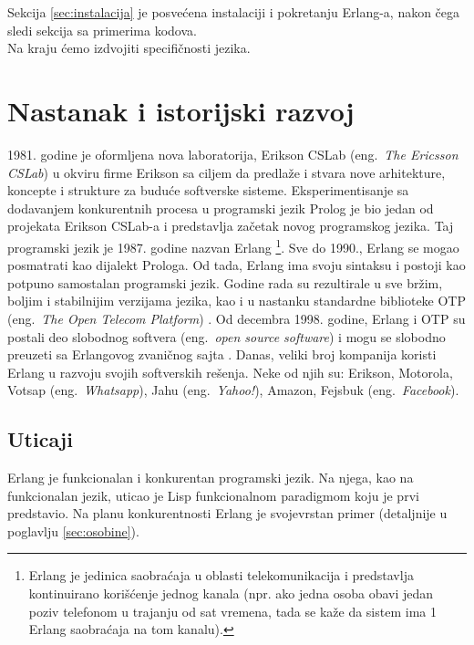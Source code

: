 \documentclass[a4paper]{article}
\begin{document}
{Sekcija \ref{sec:instalacija} je posve\' cena instalaciji i pokretanju Erlang-a, nakon \v cega sledi sekcija sa primerima kodova.\\

Na kraju \' cemo izdvojiti specifičnosti jezika.

\section{Nastanak i istorijski razvoj}
\label{sec:nastanak}

1981. godine je oformljena nova laboratorija, Erikson CSLab (eng.~{\em The Ericsson CSLab}) u okviru firme Erikson sa
ciljem da predlaže i stvara nove arhitekture, koncepte i strukture za buduće softverske sisteme.
Eksperimentisanje sa dodavanjem konkurentnih procesa u programski jezik Prolog je bio jedan
od projekata Erikson CSLab-a i predstavlja začetak novog programskog jezika.
Taj programski jezik je 1987. godine nazvan Erlang
\footnote{Erlang je jedinica saobraćaja u oblasti telekomunikacija 
i predstavlja kontinuirano korišćenje jednog kanala 
(npr. ako jedna osoba obavi jedan poziv telefonom u trajanju od sat vremena, 
tada se kaže da sistem ima 1 Erlang saobraćaja na tom kanalu).}.    
Sve do 1990., Erlang se mogao posmatrati kao dijalekt Prologa. Od tada, Erlang
ima svoju sintaksu i postoji kao potpuno samostalan programski jezik.
Godine rada su rezultirale u sve bržim, boljim i stabilnijim verzijama jezika, kao
i u nastanku standardne biblioteke OTP (eng.~{\em The Open Telecom Platform}) \cite{phdthesis}.
Od decembra 1998. godine, Erlang i OTP su postali deo slobodnog softvera (eng.~{\em open source software})
i mogu se slobodno preuzeti sa Erlangovog zvaničnog sajta \cite{sajt}.
Danas, veliki broj kompanija koristi Erlang u razvoju
svojih softverskih rešenja. Neke od njih su: Erikson, Motorola, Votsap (eng.~{\em Whatsapp}), 
Jahu (eng.~{\em Yahoo!}), Amazon, Fejsbuk (eng.~{\em Facebook}).


\subsection{Uticaji}
\label{subsec:uticaji}

Erlang je funkcionalan i konkurentan programski jezik.
Na njega, kao na funkcionalan jezik, uticao je Lisp funkcionalnom paradigmom koju je 
prvi predstavio. Na planu konkurentnosti Erlang je svojevrstan primer (detaljnije u poglavlju \ref{sec:osobine}). \\ 

}
\end{document}

